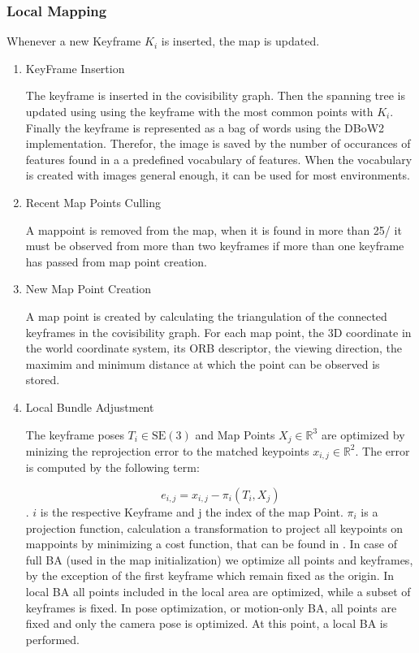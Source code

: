 	
	\subsubsection{Local Mapping}
	
	Whenever a new Keyframe $K_i$ is inserted, the map is updated. 
	
	
	\begin{enumerate}
	\item{KeyFrame Insertion}
	
	The keyframe is inserted in the covisibility graph. Then the spanning tree
	is updated using using the keyframe with the most common points with $K_i$.
	Finally the keyframe is represented as a bag of words using the DBoW2 implementation. 
	Therefor, the image is saved by the number of occurances of features found in a a predefined
	vocabulary of features. When the vocabulary is created with images general enough, 
	it can be used for most environments.
	

	
	\item{Recent Map Points Culling}
	
	A mappoint is removed from the map, when it is found in more than 
	25/%
	it must be observed from more than two keyframes if more than one keyframe 
	has passed from map point creation. 
	
	\item{New Map Point Creation}
	
	A map point is created by calculating the triangulation of the connected
	keyframes in the covisibility graph. For each map point, the 3D coordinate 
	in the world coordinate system, its ORB descriptor, the viewing direction, 
	the maximim and minimum distance at which the point can be observed is stored. 
	
	\item{Local Bundle Adjustment}
	
	The keyframe poses $T_i \in \text{SE}(3)$ and Map Points $X_j \in \mathbb{R}^{3}$ 
	are optimized by minizing the reprojection error to the matched keypoints $x_{i,j} \in \mathbb{R}^{2}$.
	The error is computed by the following term:
	
	$$ e_{i,j} = x_{i,j} - \pi_i\left(T_i, X_j\right) $$. 
	$i$ is the respective Keyframe and j the index of the map Point. 
	$\pi_i$ is a projection function, calculation a transformation 
	to project all keypoints on mappoints by minimizing a cost function, that
	can be found in \cite{ba}.
	In case of full BA
	(used in the map initialization) we optimize
	all points and keyframes, by the exception of the first
	keyframe which remain fixed as the origin. In local BA
	all points included in the local area
	are optimized, while a subset of keyframes is fixed. In
	pose optimization, or motion-only BA, all
	points are fixed and only the camera pose is optimized.
	At this point, a local BA is performed.
	

\end{enumerate}
